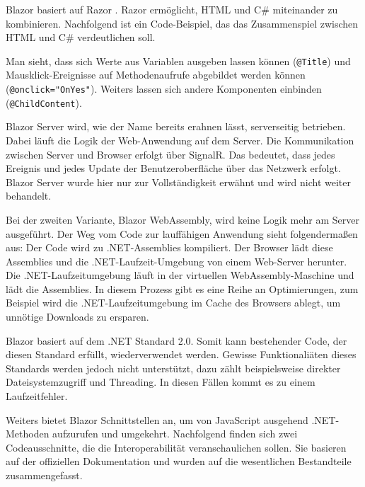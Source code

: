 Blazor basiert auf Razor \cite{Razor}. Razor ermöglicht, HTML und C\#{} miteinander zu kombinieren. Nachfolgend ist ein Code-Beispiel, das das Zusammenspiel zwischen HTML und C\#{} verdeutlichen soll.



Man sieht, dass sich Werte aus Variablen ausgeben lassen können (\lstinline{@Title}) und Maus\-klick-Ereignisse auf Methodenaufrufe abgebildet werden können (\lstinline{@onclick="OnYes"}). Weiters lassen sich andere Komponenten einbinden (\lstinline{@ChildContent}).

Blazor Server wird, wie der Name bereits erahnen lässt, serverseitig betrieben. Dabei läuft die Logik der Web-Anwendung auf dem Server. Die Kommunikation zwischen Server und Browser erfolgt über SignalR. Das bedeutet, dass jedes Ereignis und jedes Update der Benutzeroberfläche über das Netzwerk erfolgt. Blazor Server wurde hier nur zur Vollständigkeit erwähnt und wird nicht weiter behandelt.

Bei der zweiten Variante, Blazor WebAssembly, wird keine Logik mehr am Server ausgeführt. Der Weg vom Code zur lauffähigen Anwendung sieht folgendermaßen aus: Der Code wird zu .NET-Assemblies kompiliert. Der Browser lädt diese Assemblies und die .NET-Laufzeit-Umgebung von einem Web-Server herunter. Die .NET-Lauf\-zeit\-um\-ge\-bung läuft in der virtuellen WebAssembly-Maschine und lädt die Assemblies. In diesem Prozess gibt es eine Reihe an Optimierungen, zum Beispiel wird die .NET-Laufzeitumgebung im Cache des Browsers ablegt, um unnötige Downloads zu ersparen.

Blazor basiert auf dem .NET Standard 2.0. Somit kann bestehender Code, der diesen Standard erfüllt, wiederverwendet werden. Gewisse Funktionaliäten dieses Standards werden jedoch nicht unterstützt, dazu zählt beispielsweise direkter Dateisystemzugriff und Threading. In diesen Fällen kommt es zu einem Laufzeitfehler.

Weiters bietet Blazor Schnittstellen an, um von JavaScript ausgehend .NET-Methoden aufzurufen und umgekehrt. Nachfolgend finden sich zwei Codeausschnitte, die die Interoperabilität veranschaulichen sollen. Sie basieren auf der offiziellen Dokumentation und wurden auf die wesentlichen Bestandteile zusammengefasst.



